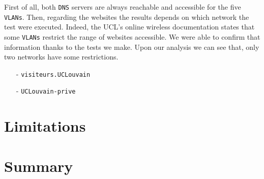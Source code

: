 First of all, both \texttt{DNS} servers are always reachable and accessible for the five \texttt{VLANs}. Then, regarding the websites the results depends on which network the test were executed. Indeed, the UCL's online wireless documentation states that some \texttt{VLANs} restrict the range of websites accessible. We were able to confirm that information thanks to the tests we make. Upon our analysis we can see that, only two networks have some restrictions.
\begin{itemize}
	\item [-] \texttt{visiteurs.UCLouvain}
	\item [-] \texttt{UCLouvain-prive}
\end{itemize}













\section{Limitations}



\section{Summary}

